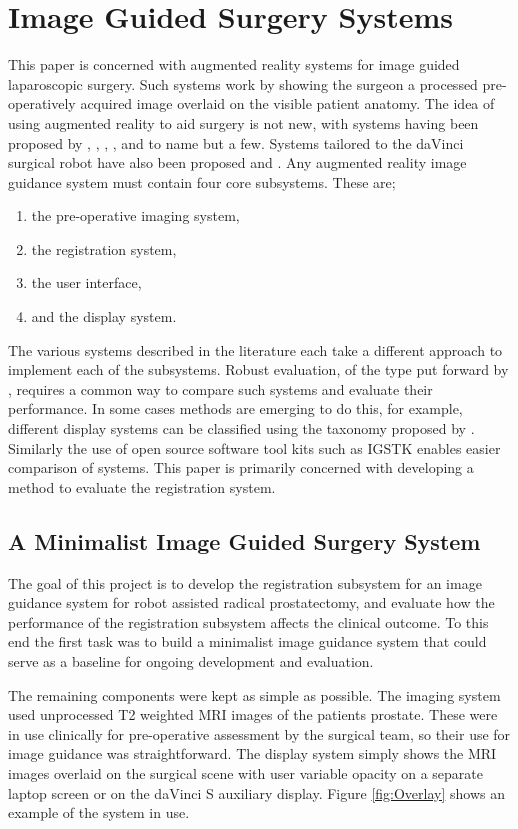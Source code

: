 \section{Image Guided Surgery Systems}
This paper is concerned with augmented reality 
systems for image guided laparoscopic surgery. Such systems
work by showing the surgeon a processed pre-operatively acquired image
overlaid on the visible patient anatomy.
The idea of using augmented reality to aid surgery is not 
new, with systems having been proposed by \cite{pap191}, \cite{pap190}, \cite{pap188}, 
\cite{pap178}, and \cite{pap210} to name but a few. 
Systems tailored to the  daVinci surgical robot 
have also been proposed \cite{pap208} and \cite{pap203}.
Any augmented reality image guidance system must contain four core subsystems.
These are;
\begin{enumerate}
\item{the pre-operative imaging system,}
\item{the registration system,}
\item{the user interface,}
\item{and the display system.}
\end{enumerate}
The various systems described in the literature each take 
a different approach to implement each of the subsystems. 
Robust evaluation, of the type put forward by \cite{pap264}, 
requires a common way to compare 
such systems and evaluate their performance. In some cases 
methods are emerging to do this, for example, different 
display systems can be classified using the taxonomy proposed by \cite{pap271}. 
Similarly the use of open source software tool kits such as IGSTK \cite{pap037}
enables easier comparison of systems. This paper is primarily concerned with
developing a method to evaluate the registration system.

\subsection{A Minimalist Image Guided Surgery System}
The goal of this project is  
to develop the registration subsystem for an image guidance system for
robot assisted radical prostatectomy, and evaluate how the 
performance of the registration subsystem affects the clinical outcome. 
To this end the first task was to build a minimalist image guidance system
that could serve as a baseline for ongoing development and evaluation.

The remaining components were kept as simple as possible.
The imaging system used unprocessed T2 weighted MRI images of the patients 
prostate. These were in use clinically for pre-operative assessment by the 
surgical team, so their use for image guidance was straightforward.
The display system simply shows the MRI images overlaid on the
surgical scene with user variable opacity on a separate laptop screen or
on the daVinci S auxiliary display.
Figure \ref{fig:Overlay} shows 
an example of the system in use. 

